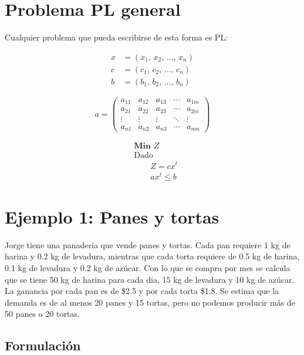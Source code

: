 \documentclass[12pt]{article}
\begin{document}
\section{Problema PL general}

Cualquier problema que pueda escribirse de esta forma es PL:

\begin{minipage}{0.48\textwidth}
\begin{align*}
x &= (x_1,\, x_2,\, \ldots,\, x_n) \\
c &= (c_1,\, c_2,\, \ldots,\, c_n) \\
b &= (b_1,\, b_2,\, \ldots,\, b_n)
\end{align*}
\end{minipage}
\hfill
\begin{minipage}{0.48\textwidth}
\[
a = 
\begin{pmatrix}
a_{11} & a_{12} & a_{13} & \cdots & a_{1m} \\
a_{21} & a_{22} & a_{23} & \cdots & a_{2m} \\
\vdots & \vdots & \vdots & \ddots & \vdots \\
a_{n1} & a_{n2} & a_{n3} & \cdots & a_{nm}
\end{pmatrix}
\]
\end{minipage}

\vspace{1em}

\begin{align*}
&\textbf{Min } Z \\
&\text{Dado} \\
&\qquad Z = c x^t \\
&\qquad a x^t \leq b
\end{align*}

\section{Ejemplo 1: Panes y tortas}

Jorge tiene una panadería que vende panes y tortas. Cada pan requiere 1 kg de harina y 0.2 kg de levadura, mientras que cada torta requiere de 0.5 kg de harina, 0.1 kg de levadura y 0.2 kg de azúcar. Con lo que se compra por mes se calcula que se tiene 50 kg de harina para cada dia, 15 kg de levadura y 10 kg de azúcar. La ganancia por cada pan es de \$2.5 y por cada torta \$1.8. Se estima que la demanda es de al menos 20 panes y 15 tortas, pero no podemos producir más de 50 panes o 20 tortas.

\subsection{Formulación}
\end{document}

